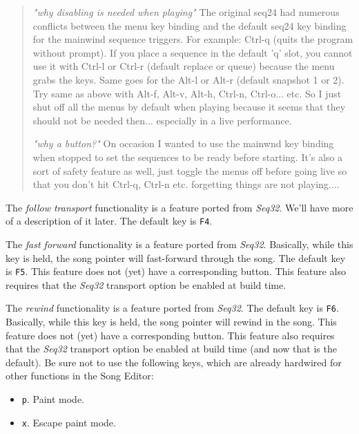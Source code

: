    \begin{quotation}
      \textsl{"why disabling is needed when playing"}
      The original seq24 had numerous conflicts between the menu key binding
      and the default seq24 key binding for the mainwind sequence triggers.
      For example: Ctrl-q (quits the program without prompt). If you place a
      sequence in the default 'q' slot, you cannot use it with Ctrl-l or Ctrl-r
      (default replace or queue) because the menu grabs the keys. Same goes for
      the Alt-l or Alt-r (default snapshot 1 or 2). Try same as above with
      Alt-f, Alt-v, Alt-h, Ctrl-n, Ctrl-o...  etc. So I just shut off all the
      menus by default when playing because it seems that they should not be
      needed then... especially in a live performance.

      \textsl{"why a button?"}
      On occasion I wanted to use the mainwnd key binding when stopped to set
      the sequences to be ready before starting. It's also a sort of safety
      feature as well, just toggle the menus off before going live so that you
      don't hit Ctrl-q, Ctrl-n etc. forgetting things are not playing....
   \end{quotation}

   The \textsl{follow transport} functionality is a feature ported
   from \textsl{Seq32}.  We'll have more of a description of it later.
   The default key is \texttt{F4}.

   The \textsl{fast forward} functionality is a feature ported
   from \textsl{Seq32}.
   Basically, while this key is held, the song pointer will fast-forward
   through the song.
   The default key is \texttt{F5}.
   This feature does not (yet) have a corresponding button.
   This feature also requires that the \textsl{Seq32} transport option be
   enabled at build time.

   The \textsl{rewind} functionality is a feature ported
   from \textsl{Seq32}.
   The default key is \texttt{F6}.
   Basically, while this key is held, the song pointer will rewind in
   the song.
   This feature does not (yet) have a corresponding button.
   This feature also requires that the \textsl{Seq32} transport option be
   enabled at build time (and now that is the default).
   Be sure not to use the following keys, which are already
   hardwired for other functions in the Song Editor:

   \begin{itemize}
      \item \texttt{p}.  Paint mode.
      \item \texttt{x}.  Escape paint mode.
   \end{itemize}

